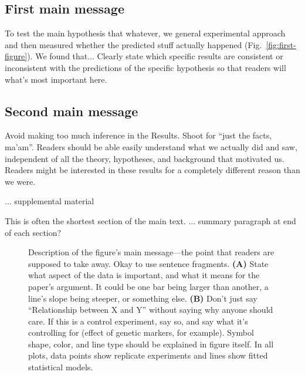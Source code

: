 \documentclass[11pt]{article}
\begin{document}
\subsection{First main message}

To test the main hypothesis that whatever, we general experimental approach and then measured whether the predicted stuff actually happened (Fig.~\ref{fig:first-figure}). 
We found that...
Clearly state which specific results are consistent or inconsistent with the predictions of the specific hypothesis so that readers will what's most important here. 

\subsection{Second main message}

Avoid making too much inference in the Results. Shoot for ``just the facts, ma'am''. Readers should be able easily understand what we actually did and saw, independent of all the theory, hypotheses, and background that motivated us. Readers might be interested in these results for a completely different reason than we were. 

... supplemental material

This is often the shortest section of the main text. 
... summary paragraph at end of each section?





\begin{figure}[p]
\caption{
Description of the figure's main message---the point that readers are supposed to take away. 
Okay to use sentence fragments. 
\textbf{(A)} State what aspect of the data is important, and what it means for the paper's argument. It could be one bar being larger than another, a line's slope being steeper, or something else. 
\textbf{(B)} Don't just say ``Relationship between X and Y'' without saying why anyone should care. If this is a control experiment, say so, and say what it's controlling for (effect of genetic markers, for example). Symbol shape, color, and line type should be explained in figure itself. 
In all plots, data points show replicate experiments and lines show fitted statistical models. 
}
\label{fig:first-message}
\end{figure}
\end{document}
